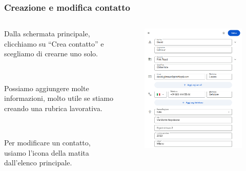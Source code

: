 \documentclass[handout]{beamer}
\begin{document}
\begin{frame}
\frametitle{Creazione e modifica contatto}
\begin{columns}
  \begin{column}{.4\textwidth}
    Dalla schermata principale, clicchiamo su ``Crea contatto'' e scegliamo di crearne uno solo.\pause

    ~
    
    Possiamo aggiungere molte informazioni, molto utile se stiamo creando una \alert{rubrica lavorativa}.\pause

    ~

    Per modificare un contatto, usiamo l'icona della matita dall'elenco principale.
  \end{column}
  \begin{column}{.5\textwidth}
    \begin{figure}
      \includegraphics[width=\columnwidth]{img/nuovocontatto.png}
    \end{figure}
  \end{column}
\end{columns}
\end{frame}
\end{document}
